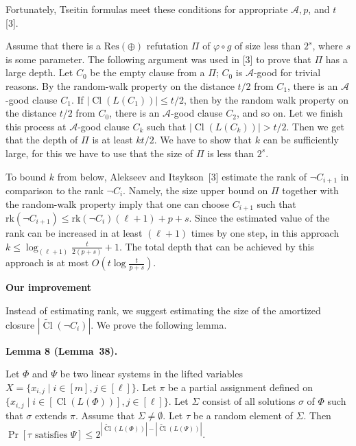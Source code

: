 Fortunately, Tseitin formulas meet these conditions for appropriate $\mathcal{A},p$, and $t$ [3].\par



Assume that there is a $\mathrm{Res}(\oplus)$ refutation $\Pi$ of $\varphi\circ g$ of size less than $2^{s}$, where $s$ is some parameter. The following argument was used in [3] to prove that $\Pi$ has a large depth. Let $C_{0}$ be the empty clause from a $\Pi$; $C_{0}$ is $\mathcal{A}$-good for trivial reasons.
By the random-walk property on the distance $t/2$ from $C_{1}$, there is an $\mathcal{A}$-good clause $C_{1}$. If $|\mathop{\mathrm{Cl}}(L(C_{1}))|\leq t/2$, then by the random walk property on the distance $t/2$ from $C_{0}$, there is an $\mathcal{A}$-good clause $C_{2}$, and so on. Let we finish this process at $\mathcal{A}$-good clause $C_{k}$ such that $|\mathop{\mathrm{Cl}}(L(C_{k}))|>t/2$. Then we get that the depth of $\Pi$ is at least $kt/2$. We have to show that $k$ can be sufficiently large, for this we have to use that the size of $\Pi$ is less than $2^{s}$.\par



To bound $k$ from below, Alekseev and Itsykson [3] estimate the rank of $\lnot C_{i+1}$ in comparison to the rank $\lnot C_{i}$. Namely, the size upper bound on $\Pi$ together with the random-walk property imply that one can choose $C_{i+1}$ such that $\mathrm{rk}(\lnot C_{i+1})\leq\mathrm{rk}(\lnot C_{i})(\ell+1)+p+s$. Since the estimated value of the rank can be increased in at least $(\ell+1)$ times by one step, in this approach $k\leq\log_{(\ell+1)}\frac{t}{2(p+s)}+1$. The total depth that can be achieved by this approach is at most $O(t\log\frac{t}{p+s})$.\par


\par\medskip\noindent\textbf{Our improvement}\par


Instead of estimating rank, we suggest estimating the size of the amortized closure $|\widetilde{\mathop{\mathrm{Cl}}}(\lnot C_{i})|$. We prove the following lemma.\par



\par\medskip\noindent\textbf{
Lemma 8 (Lemma 38).
}\par



Let $\Phi$ and $\Psi$ be two linear systems in the lifted variables $X=\{x_{i,j}\mid i\in[m],j\in[\ell]\}$. Let $\pi$ be a partial assignment defined on $\{x_{i,j}\mid i\in[\mathop{\mathrm{Cl}}(L(\Phi))],j\in[\ell]\}$. Let $\Sigma$ consist of all solutions $\sigma$ of $\Phi$ such that $\sigma$ extends $\pi$. Assume that $\Sigma\neq\emptyset$. Let $\tau$ be a random element of $\Sigma$. Then $\Pr[\tau\mbox{ satisfies }\Psi]\leq 2^{|\widetilde{\mathop{\mathrm{Cl}}}(L(\Phi))|-|\widetilde{\mathop{\mathrm{Cl}}}(L(\Psi))|}$.\par




